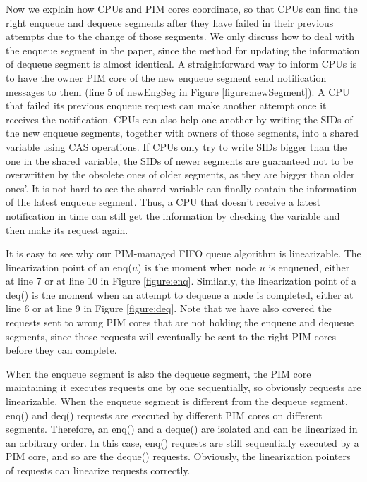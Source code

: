 \documentclass[11pt, letterpaper]{article}   	%
\begin{document}
Now we explain how CPUs and PIM cores coordinate, so that CPUs can find the right enqueue and 
dequeue segments after they have failed in their previous attempts due to the change of those segments. 
We only discuss how to deal with the enqueue segment in the paper, 
since the method for updating the information of dequeue segment is almost identical. 
A straightforward way to inform CPUs is to have the owner PIM core of the new enqueue segment 
send notification messages to them (line 5 of newEngSeg in Figure \ref{figure:newSegment}). 
A CPU that failed its previous enqueue request can make another attempt once it receives the notification. 
CPUs can also help one another by writing the SIDs of the new enqueue segments, 
together with owners of those segments, into a shared variable using CAS operations. 
If CPUs only try to write SIDs bigger than the one in the shared variable, the SIDs of newer segments are 
guaranteed not to be overwritten by the obsolete ones of older segments, as they are bigger than older ones'. 
It is not hard to see the shared variable can finally contain the information of the latest enqueue segment. 
Thus, a CPU that doesn't receive a latest notification in time can still get the information 
by checking the variable and then make its request again. 

It is easy to see why our PIM-managed FIFO queue algorithm is linearizable.
The linearization point of an enq($u$) is the moment when node $u$ is enqueued, 
either at line 7 or at line 10 in Figure \ref{figure:enq}. 
Similarly, the linearization point of a deq() is the moment when an attempt to dequeue a node is completed, 
either at line 6 or at line 9 in Figure \ref{figure:deq}.
Note that we have also covered the requests sent to wrong PIM cores that are not holding the enqueue and 
dequeue segments, since those requests will eventually be sent to the right PIM cores before they can complete. 

When the enqueue segment is also the dequeue segment, the PIM core maintaining it executes requests 
one by one sequentially, so obviously requests are linearizable.
When the enqueue segment is different from the dequeue segment, 
enq() and deq() requests are executed by different PIM cores on different segments. 
Therefore, an enq() and a deque() are isolated and can be linearized in an arbitrary order. 
In this case, enq() requests are still sequentially executed by a PIM core, and so are the deque() requests. 
Obviously, the linearization pointers of requests can linearize requests correctly. 
\end{document}
